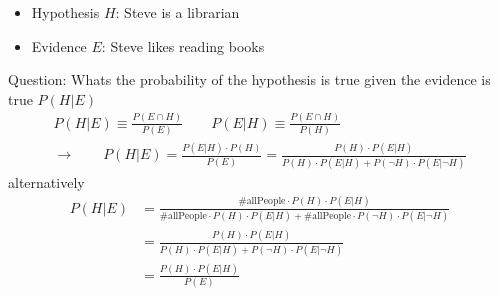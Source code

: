 \documentclass[10pt,a4paper]{book}
\theoremstyle{definition}
\begin{document}
\begin{itemize}
\item Hypothesis $H$: Steve is a librarian
\item Evidence $E$: Steve likes reading books
\end{itemize}
Question: Whats the probability of the hypothesis is true given the evidence is true $P(H|E)$ 
\begin{align}
   P(H|E)\equiv\frac{P(E\cap H)}{P(E)}\qquad P(E|H)\equiv\frac{P(E\cap H)}{P(H)}\\
   \rightarrow\qquad P(H|E)=\frac{P(E|H)\cdot P(H)}{P(E)}=\frac{P(H)\cdot P(E|H)}{P(H)\cdot P(E|H)+ P(\neg H)\cdot P(E|\neg H)}
\end{align}
alternatively
\begin{align}
  P(H|E)&=\frac{\#\text{allPeople}\cdot P(H)\cdot P(E|H)}{\#\text{allPeople}\cdot P(H)\cdot P(E|H)+\#\text{allPeople}\cdot P(\neg H)\cdot P(E|\neg H)}\\
  &=\frac{P(H)\cdot P(E|H)}{P(H)\cdot P(E|H)+ P(\neg H)\cdot P(E|\neg H)}\\
  &=\frac{P(H)\cdot P(E|H)}{P(E)}
\end{align}

\begin{center}
\end{center}
\end{document}
